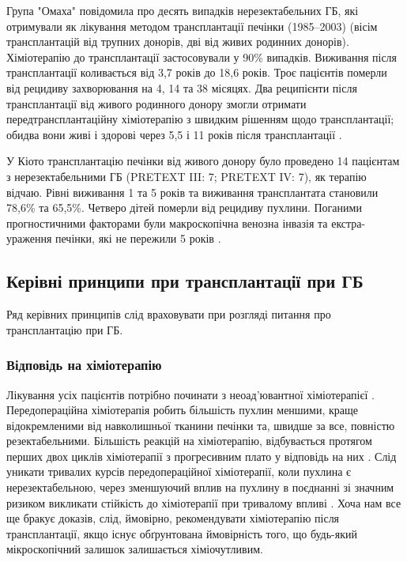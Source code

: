 Група "Омаха" повідомила про десять випадків нерезектабельних ГБ, які отримували як лікування методом трансплантації печінки (1985–2003) (вісім трансплантацій від трупних донорів, дві від живих родинних донорів). Хіміотерапію до трансплантації застосовували у 90\% випадків. Виживання після трансплантації коливається від 3,7 років до 18,6 років. Троє пацієнтів померли від рецидиву захворювання на 4, 14 та 38 місяцях. Два реципієнти після трансплантації від живого родинного донору змогли отримати передтрансплантаційну хіміотерапію з швидким рішенням щодо трансплантації; обидва вони живі і здорові через 5,5 і 11 років після трансплантації \cite{pmid2544067}. 

У Кіото трансплантацію печінки від живого донору було проведено 14 пацієнтам з нерезектабельними ГБ (PRETEXT III: 7; PRETEXT IV: 7), як терапію відчаю. Рівні виживання 1 та 5 років та виживання трансплантата становили 78,6\% та 65,5\%. Четверо дітей померли від рецидиву пухлини. Поганими прогностичними факторами були макроскопічна венозна інвазія та екстра-ураження печінки, які не пережили 5 років \cite{pmid17430157}.

\subsection{Керівні принципи при трансплантації при ГБ}
Ряд керівних принципів слід враховувати при розгляді питання про трансплантацію при ГБ. 

\subsubsection{Відповідь на хіміотерапію} 
Лікування усіх пацієнтів потрібно починати з неоад'ювантної хіміотерапієї \cite{pmid12352881}. Передопераційна хіміотерапія робить більшість пухлин меншими, краще відокремленими від навколишньої тканини печінки та, швидше за все, повністю резектабельними. Більшість реакцій на хіміотерапію, відбувається протягом перших двох циклів хіміотерапії з прогресивним плато у відповідь на них \cite{pmid12778356}. Слід уникати тривалих курсів передопераційної хіміотерапії, коли пухлина є нерезектабельною, через зменшуючий вплив на пухлину в поєднанні зі значним ризиком викликати стійкість до хіміотерапії при тривалому впливі \cite{pmid25649007}. Хоча нам все ще бракує доказів, слід, ймовірно, рекомендувати хіміотерапію після трансплантації, якщо існує обґрунтована ймовірність того, що будь-який мікроскопічний залишок залишається хіміочутливим.

